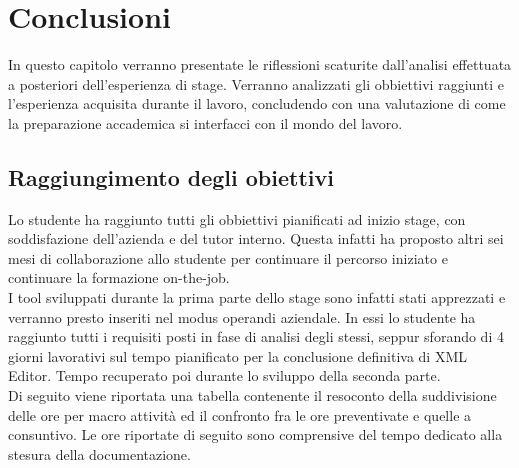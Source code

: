 
\chapter{Conclusioni}
\label{cap:conclusioni}

In questo capitolo verranno presentate le riflessioni scaturite dall'analisi effettuata a posteriori dell'esperienza di stage. Verranno analizzati gli obbiettivi raggiunti e l'esperienza acquisita durante il lavoro, concludendo con una valutazione di come la preparazione accademica si interfacci con il mondo del lavoro.

\section{Raggiungimento degli obiettivi}

Lo studente ha raggiunto tutti gli obbiettivi pianificati ad inizio stage, con soddisfazione dell'azienda e del tutor interno. Questa infatti ha proposto altri sei mesi di collaborazione allo studente per continuare il percorso iniziato e continuare la formazione on-the-job.\\

I tool sviluppati durante la prima parte dello stage sono infatti stati apprezzati e verranno presto inseriti nel modus operandi aziendale. In essi lo studente ha raggiunto tutti i requisiti posti in fase di analisi degli stessi, seppur sforando di 4 giorni lavorativi sul tempo pianificato per la conclusione definitiva di XML Editor. Tempo recuperato poi durante lo sviluppo della seconda parte.\\

Di seguito viene riportata una tabella contenente il resoconto della suddivisione delle ore per macro attività ed il confronto fra le ore preventivate e quelle a consuntivo. Le ore riportate di seguito sono comprensive del tempo dedicato alla stesura della documentazione.

